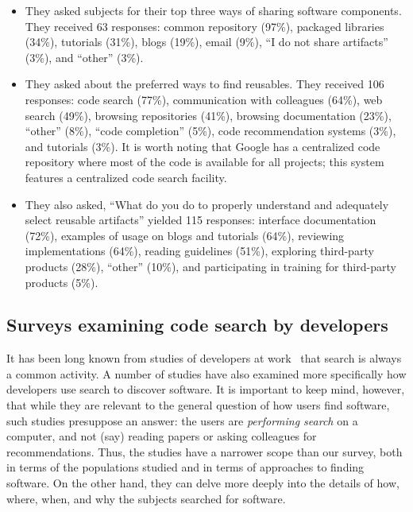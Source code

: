 \documentclass{casicswhitepaper}
\begin{document}
\begin{itemize}

\item They asked subjects for their top three ways of sharing software components.  They received 63 responses: common repository (97\%), packaged libraries (34\%), tutorials (31\%), blogs (19\%), email (9\%), ``I do not share artifacts'' (3\%), and ``other'' (3\%).

\item They asked about the preferred ways to find reusables.  They received 106 responses: code search (77\%), communication with colleagues (64\%), web search (49\%), browsing repositories (41\%), browsing documentation (23\%), ``other'' (8\%), ``code completion'' (5\%), code recommendation systems (3\%), and tutorials (3\%).  It is worth noting that Google has a centralized code repository where most of the code is available for all projects; this system features a centralized code search facility.

\item They also asked, ``What do you do to properly understand and adequately select reusable artifacts'' yielded 115 responses: interface documentation (72\%), examples of usage on blogs and tutorials (64\%), reviewing implementations (64\%), reading guidelines (51\%), exploring third-party products (28\%), ``other'' (10\%), and participating in training for third-party products (5\%).

\end{itemize}


\subsection{Surveys examining code search by developers}

It has been long known from studies of developers at work~\cite[e.g.,][]{singer1997examination} that search is always a common activity.  A number of studies have also examined more specifically how developers use search to discover software.  It is important to keep mind, however, that while they are relevant to the general question of how users find software, such studies presuppose an answer: the users are \emph{performing search} on a computer, and not (say) reading papers or asking colleagues for recommendations.  Thus, the studies have a narrower scope than our survey, both in terms of the populations studied and in terms of approaches to finding software.  On the other hand, they can delve more deeply into the details of how, where, when, and why the subjects searched for software.
\end{document}
